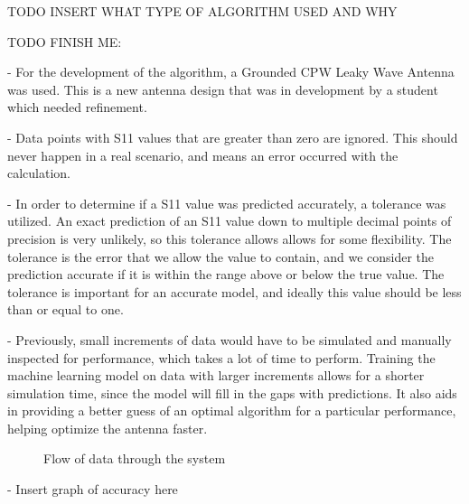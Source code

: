 \documentclass[lettersize,journal]{IEEEtran}
\begin{document}
TODO INSERT WHAT TYPE OF ALGORITHM USED AND WHY

TODO  FINISH ME:

- For the development of the algorithm, a Grounded CPW Leaky Wave Antenna was used. This is a new antenna design that was in development by a student which needed refinement.

- Data points with S11 values that are greater than zero are ignored. This should never happen in a real scenario, and means an error occurred with the calculation.

- In order to determine if a S11 value was predicted accurately, a tolerance was utilized. An exact prediction of an S11 value down to multiple decimal points of precision is very unlikely, so this tolerance allows allows for some flexibility. The tolerance is the error that we allow the value to contain, and we consider the prediction accurate if it is within the range above or below the true value. The tolerance is important for an accurate model, and ideally this value should be less than or equal to one.

- Previously, small increments of data would have to be simulated and manually inspected for performance, which takes a lot of time to perform. Training the machine learning model on data with larger increments allows for a shorter simulation time, since the model will fill in the gaps with predictions. It also aids in providing a better guess of an optimal algorithm for a particular performance, helping optimize the antenna faster. 

\begin{figure}[!t]
\centering
{}
\caption{Flow of data through the system}
\label{fig_sim}
\end{figure}
    
- Insert graph of accuracy here 







\vfill
\end{document}
